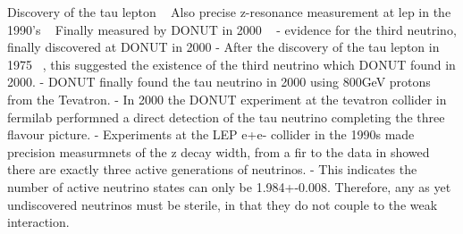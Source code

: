 Discovery of the tau lepton ~\cite{perl1975}
Also precise z-resonance measurement at lep in the 1990's ~\cite{electroweak2006}
Finally measured by DONUT in 2000 ~\cite{Kodama2001}
- evidence for the third neutrino, finally discovered at DONUT in 2000
- After the discovery of the tau lepton in 1975 ~\cite{perl1975}, this suggested the existence of the third neutrino which DONUT found in 2000.
- DONUT finally found the tau neutrino in 2000 using 800GeV protons from the Tevatron.
- In 2000 the DONUT experiment at the tevatron collider in fermilab performned a direct detection of the tau neutrino completing the three flavour picture.
- Experiments at the LEP e+e- collider in the 1990s made precision measurmnets of the z decay width, from a fir to the data in showed there are exactly three active generations of neutrinos.
- This indicates the number of active neutrino states can only be 1.984+-0.008. Therefore, any as yet undiscovered neutrinos must be sterile, in that they do not couple to the weak interaction.


